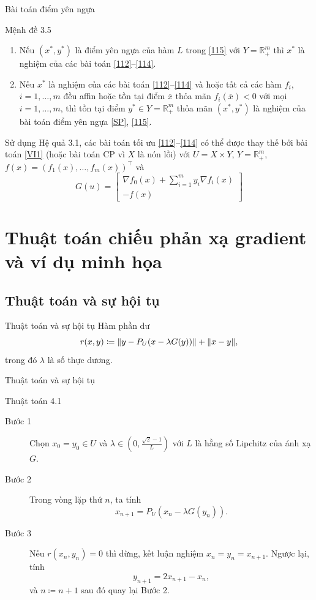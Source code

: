 \documentclass[aspectratio=169]{beamer}
\DeclarePairedDelimiter{\norm}{\lVert}{\rVert}
\theoremstyle{plain}
\theoremstyle{definition}
\theoremstyle{remark}
\begin{document}
\begin{frame}{Bài toán điểm yên ngựa}
\begin{block}{Mệnh đề 3.5}
\begin{enumerate}
    \item Nếu $(x^*,y^*)$ là điểm yên ngựa của hàm $L$ trong \eqref{115} với $Y=\mathbb{R}^m_+$ thì $x^*$ là nghiệm của các bài toán \eqref{112}--\eqref{114}.
    \item Nếu $x^*$ là nghiệm của các bài toán \eqref{112}--\eqref{114} và hoặc tất cả các hàm $f_i$, $i=1,\ldots,m$ đều affin hoặc tồn tại điểm $\overline{x}$ thỏa mãn $f_i(\overline{x})<0$ với mọi $i=1,\ldots,m$, thì tồn tại điểm $y^*\in Y=\mathbb{R}^m_+$ thỏa mãn $(x^*,y^*)$ là nghiệm của bài toán điểm yên ngựa \eqref{SP}, \eqref{115}.
\end{enumerate}
\end{block}
Sử dụng Hệ quả 3.1, các bài toán tối ưu \eqref{112}--\eqref{114} có thể được thay thế bởi bài toán \eqref{VI1} (hoặc bài toán CP vì $X$ là nón lồi) với $U=X\times Y$, $Y=\mathbb{R}^m_+$, $f(x)=(f_1(x),\ldots,f_m(x))^\top$ và 
\begin{equation*}
    G(u) = \begin{bmatrix}
    \nabla f_0(x)+\sum_{i=1}^my_i\nabla f_i(x) \\ -f(x)
    \end{bmatrix}\label{116}
\end{equation*}
\end{frame}

\section{Thuật toán chiếu phản xạ gradient và ví dụ minh họa}
\subsection{Thuật toán và sự hội tụ}
\begin{frame}{Thuật toán và sự hội tụ}\pause
Hàm phần dư
$$
r(x,y)\coloneqq\norm{y-P_U(x-\lambda G(y))}+\norm{x-y},
$$
trong đó $\lambda$ là số thực dương.
\end{frame}
\begin{frame}{Thuật toán và sự hội tụ}
\begin{block}{Thuật toán 4.1}
\begin{description}
    \item[Bước 1] Chọn $x_0=y_0\in U$ và $\lambda\in(0,\frac{\sqrt{2}-1}{L})$ với $L$ là hằng số Lipchitz của ánh xạ $G$.
    \item[Bước 2] Trong vòng lặp thứ $n$, ta tính  
    $$
    x_{n+1}=P_U(x_n-\lambda G(y_n)).
    $$
    \item[Bước 3] Nếu $r(x_n,y_n)=0$ thì dừng, kết luận nghiệm $x_n=y_n=x_{n+1}$. Ngược lại, tính 
    $$
    y_{n+1} = 2x_{n+1} - x_n,
    $$
    và $n\coloneqq n+1$ sau đó quay lại Bước 2.
\end{description}
\end{block}
\end{frame}
\end{document}
